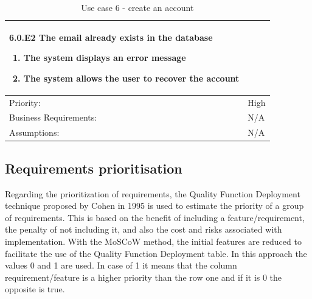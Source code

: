 \begin{table}[H]
\begin{adjustbox}{width=1.2\textwidth,center=\textwidth}
\begin{tabular}{|m{4cm}|m{12cm}|}
\begin{enumerate}
            \end{enumerate}
            \textbf{6.0.E2 The email already exists in the database}
            \begin{enumerate}
                \item The system displays an error message
                \item The system allows the user to recover the account
            \end{enumerate} \\
            \hline
            Priority: & High \\
            \hline
            Business Requirements: & N/A \\
            \hline
            Assumptions: & N/A \\
            \hline
        \end{tabular}
    \end{adjustbox}
    \vspace{1em}
    \caption{Use case 6 - create an account}
    \label{use case 6}
\end{table}

\subsection*{Requirements prioritisation}

Regarding the prioritization of requirements, the Quality Function Deployment technique
proposed by Cohen in 1995 is used to estimate the priority of a group of requirements.
This is based on the benefit of including a feature/requirement, the penalty of not including
it, and also the cost and risks associated with implementation. With the MoSCoW method, the
initial features are reduced to facilitate the use of the Quality Function Deployment table.
\newline
In this approach the values 0 and 1 are used. In case of 1 it means that the column requirement/feature
is a higher priority than the row one and if it is 0 the opposite is true.

